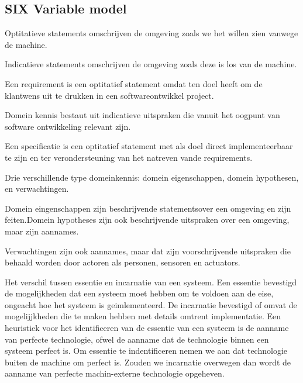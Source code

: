 \documentclass{article}
\begin{document}
\subsection{SIX Variable model}
Optitatieve statements omschrijven de omgeving zoals we het willen zien vanwege de machine. 

Indicatieve statements omschrijven de omgeving zoals deze is los van de machine. 

Een requirement is een optitatief statement omdat ten doel heeft om de klantwens uit te drukken in een softwareontwikkel project. 

Domein kennis bestaut uit indicatieve uitspraken die vanuit het oogpunt van software ontwikkeling relevant zijn. 

Een specificatie is een optitatief statement met als doel direct implementeerbaar te zijn en ter verondersteuning van het natreven vande requirements. 

Drie verschillende type domeinkennis: domein eigenschappen, domein hypothesen, en verwachtingen. 

Domein eingenschappen  zijn beschrijvende statementsover een omgeving en zijn feiten.Domein hypotheses  zijn ook beschrijvende uitspraken over een omgeving, maar zijn aannames. 

Verwachtingen zijn ook aannames, maar dat zijn voorschrijvende uitspraken die behaald worden door actoren als personen, sensoren en actuators. 

Het verschil tussen essentie en incarnatie van een systeem. Een essentie bevestigd de  mogelijkheden dat een systeem moet hebben om te voldoen aan de eise, ongeacht hoe het systeem is geimlementeerd. De incarnatie bevestigd of omvat de mogelijjkheden die te maken hebben met details omtrent implementatie. Een heuristiek voor het identificeren van de essentie van een systeem is de aanname van perfecte technologie, ofwel de aanname dat de technologie binnen een systeem perfect is. Om essentie te indentificeren nemen we aan dat technologie buiten de machine om perfect is. Zouden we incarnatie overwegen dan wordt de aanname van perfecte machin-externe technologie opgeheven. 
\end{document}
